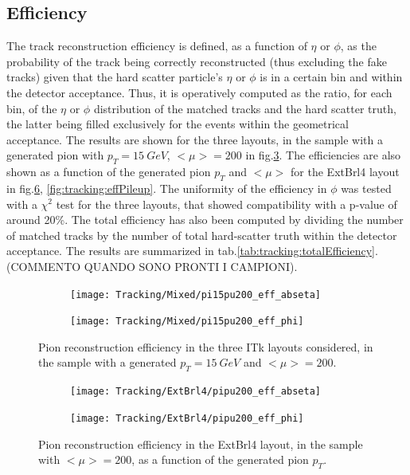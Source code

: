 \documentclass[a4paper,twoside,12pt]{article}
\begin{document}
\subsection{Efficiency}
The track reconstruction efficiency is defined, as a function of $\eta$ or $\phi$, as the probability of the track being correctly reconstructed (thus excluding the fake tracks) given that
the hard scatter particle's $\eta$ or $\phi$ is in a certain bin and within the detector acceptance. Thus, it is operatively computed as the ratio, for each bin, of the $\eta$ or $\phi$ distribution
of the matched tracks and the hard scatter truth, the latter being filled exclusively for the events within the geometrical acceptance. The results are shown for the three layouts, in the
sample with a generated pion with $p_{T} = 15\ GeV$, $<\mu> = 200$ in fig.\ref{fig:tracking:effLayout}. The efficiencies are also shown as a function of the generated pion $p_{T}$ and $<\mu>$ for the ExtBrl4 layout in fig.\ref{fig:tracking:effPt}, \ref{fig:tracking:effPileup}. The uniformity of the efficiency in $\phi$ was tested with a $\chi^{2}$ test for the three layouts, that 
showed compatibility with a p-value of around 20\%. The total efficiency has also been computed by dividing the number of matched tracks by the number of total hard-scatter truth within
the detector acceptance. The results are summarized in tab.\ref{tab:tracking:totalEfficiency}. (COMMENTO QUANDO SONO PRONTI I CAMPIONI).\\

\begin{figure}
\begin{subfigure}{.5\linewidth}
\centering
\texttt{[image: Tracking/Mixed/pi15pu200\_eff\_abseta]}
\caption{} 
\label{fig:tracking:pi15pu200_eff_abseta}
\end{subfigure}
\begin{subfigure}{.5\linewidth}
\centering
\texttt{[image: Tracking/Mixed/pi15pu200\_eff\_phi]}
\caption{} 
\label{fig:tracking:pi15pu200_eff_phi}
\end{subfigure}
\caption{Pion reconstruction efficiency in the three ITk layouts considered, in the sample with a generated $p_{T} = 15\ GeV$ and $<\mu> = 200$.}
\label{fig:tracking:effLayout}
\end{figure}

\begin{figure}
\begin{subfigure}{.5\linewidth}
\centering
\texttt{[image: Tracking/ExtBrl4/pipu200\_eff\_abseta]}
\caption{} 
\label{fig:tracking:pipu200_eff_abseta}
\end{subfigure}
\begin{subfigure}{.5\linewidth}
\centering
\texttt{[image: Tracking/ExtBrl4/pipu200\_eff\_phi]}
\caption{} 
\label{fig:tracking:pipu200_eff_phi}
\end{subfigure}
\caption{Pion reconstruction efficiency in the ExtBrl4 layout, in the sample with $<\mu> = 200$, as a function of the generated pion $p_{T}$.}
\label{fig:tracking:effPt}
\end{figure}
\end{document}
